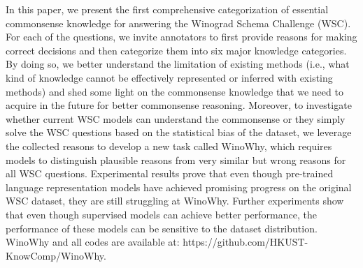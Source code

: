 In this paper, we present the first comprehensive categorization of essential commonsense knowledge for answering the Winograd Schema Challenge (WSC). For each of the questions, we invite annotators to first provide reasons for making correct decisions and then categorize them into six major knowledge categories. By doing so, we better understand the limitation of existing methods (i.e., what kind of knowledge cannot be effectively represented or inferred with existing methods) and shed some light on the commonsense knowledge that we need to acquire in the future for better commonsense reasoning. Moreover, to investigate whether current WSC models can understand the commonsense or they simply solve the WSC questions based on the statistical bias of the dataset, we leverage the collected reasons to develop a new task called WinoWhy, which requires models to distinguish plausible reasons from very similar but wrong reasons for all WSC questions. Experimental results prove that even though pre-trained language representation models have achieved promising progress on the original WSC dataset, they are still struggling at WinoWhy. Further experiments show that even though supervised models can achieve better performance, the performance of these models can be sensitive to the dataset distribution. WinoWhy and all codes are available at: https://github.com/HKUST-KnowComp/WinoWhy.
